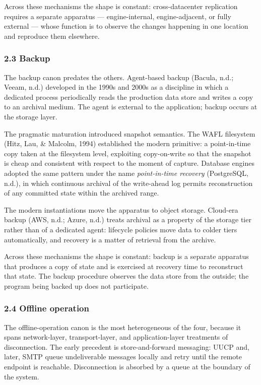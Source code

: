 \documentclass[
]{article}
\begin{document}
Across these mechanisms the shape is constant: cross-datacenter
replication requires a separate apparatus --- engine-internal,
engine-adjacent, or fully external --- whose function is to observe the
changes happening in one location and reproduce them elsewhere.

\subsubsection{2.3 Backup}\label{backup}

The backup canon predates the others. Agent-based backup (Bacula, n.d.;
Veeam, n.d.) developed in the 1990s and 2000s as a discipline in which a
dedicated process periodically reads the production data store and
writes a copy to an archival medium. The agent is external to the
application; backup occurs at the storage layer.

The pragmatic maturation introduced snapshot semantics. The WAFL
filesystem (Hitz, Lau, \& Malcolm, 1994) established the modern
primitive: a point-in-time copy taken at the filesystem level,
exploiting copy-on-write so that the snapshot is cheap and consistent
with respect to the moment of capture. Database engines adopted the same
pattern under the name \emph{point-in-time recovery} (PostgreSQL, n.d.),
in which continuous archival of the write-ahead log permits
reconstruction of any committed state within the archived range.

The modern instantiations move the apparatus to object storage.
Cloud-era backup (AWS, n.d.; Azure, n.d.) treats archival as a property
of the storage tier rather than of a dedicated agent: lifecycle policies
move data to colder tiers automatically, and recovery is a matter of
retrieval from the archive.

Across these mechanisms the shape is constant: backup is a separate
apparatus that produces a copy of state and is exercised at recovery
time to reconstruct that state. The backup procedure observes the data
store from the outside; the program being backed up does not
participate.

\subsubsection{2.4 Offline operation}\label{offline-operation}

The offline-operation canon is the most heterogeneous of the four,
because it spans network-layer, transport-layer, and application-layer
treatments of disconnection. The early precedent is store-and-forward
messaging: UUCP and, later, SMTP queue undeliverable messages locally
and retry until the remote endpoint is reachable. Disconnection is
absorbed by a queue at the boundary of the system.
\end{document}
